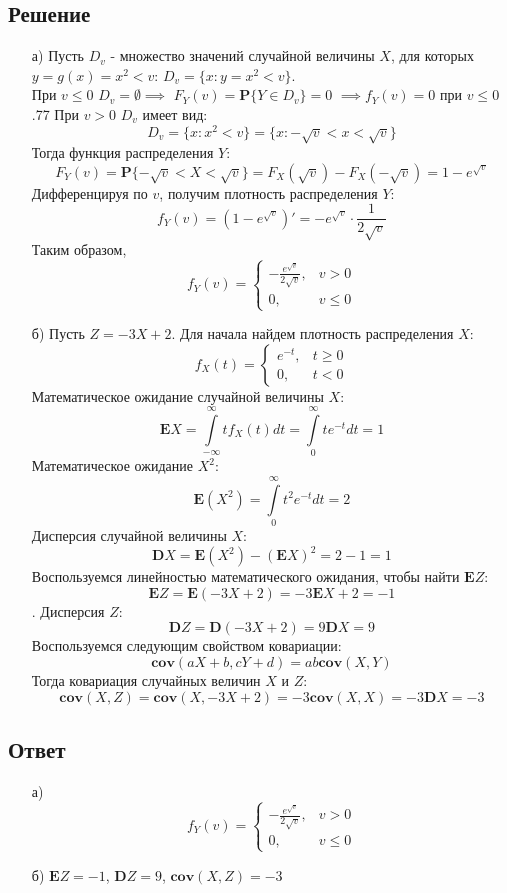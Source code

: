 \documentclass[fleqn, 10pt]{article}
\begin{document}
\subsection{Решение}
\begin{itemize}
\item[а)] Пусть \(D_v\) - множество значений случайной величины \(X\), для которых \(y=g(x)=x^2 < v\): \(D_v=\{x : y = x^2 < v\}\). \\
При \(v \leq 0\) \(D_v = \emptyset \implies\) \mbox{\(F_Y(v) =\textbf{P}\{Y\in D_v\} = 0\)} \(\implies f_Y(v) = 0\) при \(v \leq 0\).77
При \(v > 0\) \(D_v\) имеет вид:
\[D_v = \{x : x^2 < v\} = \{x : -\sqrt{v} < x < \sqrt{v}\}\]
Тогда функция распределения \(Y\):
\[F_Y(v) = \textbf{P}\{-\sqrt{v} < X < \sqrt{v}\} = F_X(\sqrt{v}) - F_X(-\sqrt{v}) = 1 - e^{\sqrt{v}}\]
Дифференцируя по \(v\), получим плотность распределения \(Y\):
\[f_Y(v) = (1 - e^{\sqrt{v}})' = -e^{\sqrt{v}}\cdot\frac{1}{2\sqrt{v}}\]
Таким образом,
\[f_Y(v) =
\begin{cases}
  -\frac{e^{\sqrt{v}}}{2\sqrt{v}}, & v > 0 \\
  0, & v \leq 0
\end{cases}
\]
\item[б)] Пусть \(Z = -3X + 2\).
  Для начала найдем плотность распределения \(X\):
  \[f_X(t) =
  \begin{cases}
    e^{-t}, & t \geq 0 \\
    0, & t < 0
  \end{cases}
  \]
  Математическое ожидание случайной величины \(X\):
  \[\textbf{E}X = \int\limits_{-\infty}^{\infty}{tf_X(t)dt} = \int\limits_{0}^{\infty}{te^{-t}dt} = 1\]
  Математическое ожидание \(X^2\):
  \[\textbf{E}(X^2) = \int\limits_{0}^{\infty}{t^2e^{-t}dt} = 2\]
  Дисперсия случайной величины \(X\):
  \[\textbf{D}X = \textbf{E}(X^2) - (\textbf{E}X)^2 = 2 - 1 = 1\]
  Воспользуемся линейностью математического ожидания, чтобы найти \(\textbf{E}Z\):
  \[\textbf{E}Z = \textbf{E}(-3X+2) = -3\textbf{E}X + 2 = -1\].
  Дисперсия \(Z\):
  \[\textbf{D}Z = \textbf{D}(-3X+2) = 9\textbf{D}X = 9\]
  Воспользуемся следующим свойством ковариации:
  \[\textbf{cov}(aX+b, cY+d) = ab\textbf{cov}(X,Y)\]
  Тогда ковариация случайных величин \(X\) и \(Z\):
  \[\textbf{cov}(X, Z) = \textbf{cov}(X, -3X+2) = -3\textbf{cov}(X, X) = -3\textbf{D}X = -3\]
  \end{itemize}
\subsection{Ответ}
\begin{itemize}
\item[а)]
  \[f_Y(v) =
\begin{cases}
  -\frac{e^{\sqrt{v}}}{2\sqrt{v}}, & v > 0 \\
  0, & v \leq 0
\end{cases}
\]
\item[б)] \(\textbf{E}Z = -1\), \(\textbf{D}Z = 9\), \(\textbf{cov}(X,Z) = -3\)
\end{itemize}
\end{document}
